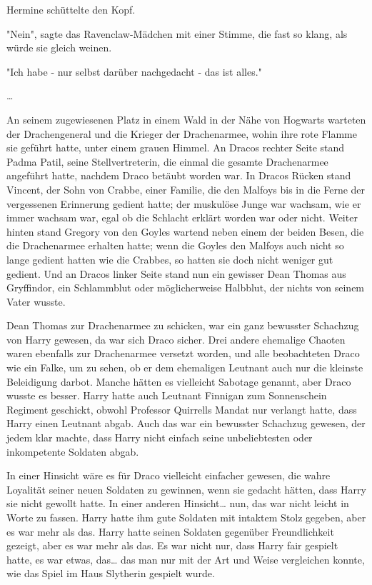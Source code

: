 {Hermine schüttelte den Kopf.

"Nein", sagte das Ravenclaw-Mädchen mit einer Stimme, die fast so klang, als würde sie gleich weinen.

"Ich habe - nur selbst darüber nachgedacht - das ist alles."

…

An seinem zugewiesenen Platz in einem Wald in der Nähe von Hogwarts warteten der Drachengeneral und die Krieger der Drachenarmee, wohin ihre rote Flamme sie geführt hatte, unter einem grauen Himmel. An Dracos rechter Seite stand Padma Patil, seine Stellvertreterin, die einmal die gesamte Drachenarmee angeführt hatte, nachdem Draco betäubt worden war. In Dracos Rücken stand Vincent, der Sohn von Crabbe, einer Familie, die den Malfoys bis in die Ferne der vergessenen Erinnerung gedient hatte; der muskulöse Junge war wachsam, wie er immer wachsam war, egal ob die Schlacht erklärt worden war oder nicht. Weiter hinten stand Gregory von den Goyles wartend neben einem der beiden Besen, die die Drachenarmee erhalten hatte; wenn die Goyles den Malfoys auch nicht so lange gedient hatten wie die Crabbes, so hatten sie doch nicht weniger gut gedient. Und an Dracos linker Seite stand nun ein gewisser Dean Thomas aus Gryffindor, ein Schlammblut oder möglicherweise Halbblut, der nichts von seinem Vater wusste.

Dean Thomas zur Drachenarmee zu schicken, war ein ganz bewusster Schachzug von Harry gewesen, da war sich Draco sicher. Drei andere ehemalige Chaoten waren ebenfalls zur Drachenarmee versetzt worden, und alle beobachteten Draco wie ein Falke, um zu sehen, ob er dem ehemaligen Leutnant auch nur die kleinste Beleidigung darbot. Manche hätten es vielleicht Sabotage genannt, aber Draco wusste es besser. Harry hatte auch Leutnant Finnigan zum Sonnenschein Regiment geschickt, obwohl Professor Quirrells Mandat nur verlangt hatte, dass Harry einen Leutnant abgab. Auch das war ein bewusster Schachzug gewesen, der jedem klar machte, dass Harry nicht einfach seine unbeliebtesten oder inkompetente Soldaten abgab.

In einer Hinsicht wäre es für Draco vielleicht einfacher gewesen, die wahre Loyalität seiner neuen Soldaten zu gewinnen, wenn sie gedacht hätten, dass Harry sie nicht gewollt hatte. In einer anderen Hinsicht… nun, das war nicht leicht in Worte zu fassen. Harry hatte ihm gute Soldaten mit intaktem Stolz gegeben, aber es war mehr als das. Harry hatte seinen Soldaten gegenüber Freundlichkeit gezeigt, aber es war mehr als das. Es war nicht nur, dass Harry fair gespielt hatte, es war etwas, das… das man nur mit der Art und Weise vergleichen konnte, wie das Spiel im Haus Slytherin gespielt wurde.

}
